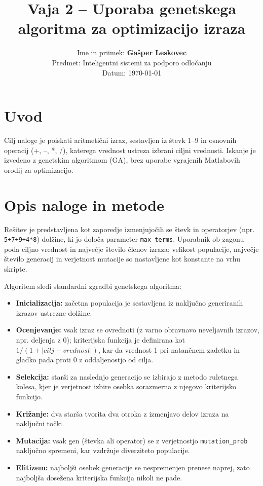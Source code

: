 \documentclass[a4paper, 11pt]{article}
\title{Vaja 2 -- Uporaba genetskega algoritma za optimizacijo izraza}
\author{Ime in priimek: \textbf{Gašper Leskovec} \\
Predmet: Inteligentni sistemi za podporo odločanju \\
Datum: \today}
\date{}
\begin{document}
\maketitle

\section{Uvod}
Cilj naloge je poiskati aritmetični izraz, sestavljen iz števk 1--9 in osnovnih operacij (+, --, *, /), katerega vrednost ustreza izbrani ciljni vrednosti. Iskanje je izvedeno z genetskim algoritmom (GA), brez uporabe vgrajenih Matlabovih orodij za optimizacijo.

\section{Opis naloge in metode}
Rešitev je predstavljena kot zaporedje izmenjujočih se števk in operatorjev (npr. \texttt{5+7+9+4*8}) dolžine, ki jo določa parameter \texttt{max\_terms}. Uporabnik ob zagonu poda ciljno vrednost in največje število členov izraza; velikost populacije, največje število generacij in verjetnost mutacije so nastavljene kot konstante na vrhu skripte.

Algoritem sledi standardni zgradbi genetskega algoritma:
\begin{itemize}
  \item \textbf{Inicializacija:} začetna populacija je sestavljena iz naključno generiranih izrazov ustrezne dolžine.
  \item \textbf{Ocenjevanje:} vsak izraz se ovrednoti (z varno obravnavo neveljavnih izrazov, npr. deljenja z 0); kriterijska funkcija je definirana kot $1/(1+|cilj - vrednost|)$, kar da vrednost 1 pri natančnem zadetku in gladko pada proti 0 z oddaljenostjo od cilja.
  \item \textbf{Selekcija:} starši za naslednjo generacijo se izbirajo z metodo ruletnega kolesa, kjer je verjetnost izbire osebka sorazmerna z njegovo kriterijsko funkcijo.
  \item \textbf{Križanje:} dva starša tvorita dva otroka z izmenjavo delov izraza na naključni točki.
  \item \textbf{Mutacija:} vsak gen (števka ali operator) se z verjetnostjo \texttt{mutation\_prob} naključno spremeni, kar vzdržuje diverziteto populacije.
  \item \textbf{Elitizem:} najboljši osebek generacije se nespremenjen prenese naprej, zato najboljša dosežena kriterijska funkcija nikoli ne pade.
\end{itemize}
\end{document}
